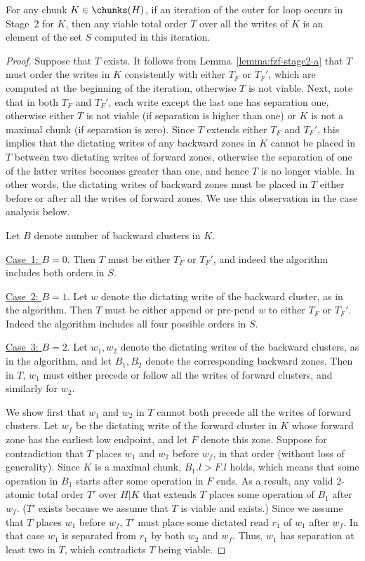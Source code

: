 \begin{lemma}
\label{lemma:fzf-stage2-b}
For any chunk $K \in \chunks(H)$, if an iteration of the outer for loop occurs in Stage~2 for $K$, then
any viable total order $T$ over all the writes of $K$ is an element
of the set $S$ computed in this iteration.
\begin{proof}
Suppose that $T$ exists.
It follows from Lemma~\ref{lemma:fzf-stage2-a} that $T$ must order the writes in $K$
consistently with either $T_F$ or $T_F'$, which are computed at the beginning of the iteration,
otherwise $T$ is not viable.
Next, note that in both $T_F$ and $T_F'$, each write except the last one has separation one,
otherwise either $T$ is not viable (if separation is higher than one) or $K$ is not a
maximal chunk (if separation is zero).
Since $T$ extends either $T_F$ and $T_F'$, this implies that
the dictating writes of any backward zones in $K$ cannot be placed in $T$ between
two dictating writes of forward zones, otherwise the separation of one of the latter writes
becomes greater than one, and hence $T$ is no longer viable.
In other words, the dictating writes of backward zones must be placed in $T$ either before
or after all the writes of forward zones.
We use this observation in the case analysis below.

Let $B$ denote number of backward clusters in $K$.

\noindent\underline{Case~1: $B = 0$}.
Then $T$ must be either $T_F$ or $T_F'$, and indeed the algorithm includes both
orders in $S$.

\noindent\underline{Case~2: $B = 1$}.
Let $w$ denote the dictating write of the backward cluster, as in the algorithm.
Then $T$ must be either append or pre-pend $w$ to either $T_F$ or $T_F'$.
Indeed the algorithm includes all four possible orders in $S$.

\noindent\underline{Case~3: $B = 2$}.
Let $w_1,w_2$ denote the dictating writes of the backward clusters, as in the algorithm,
and let $B_1,B_2$ denote the corresponding backward zones.
Then in $T$, $w_1$ must either precede or follow all the writes of forward clusters,
and similarly for $w_2$.

We show first that $w_1$ and $w_2$ in $T$ cannot both precede all the writes of forward clusters.
Let $w_f$ be the dictating write of the forward cluster in $K$ whose forward zone has the earliest low endpoint,
and let $F$ denote this zone.
Suppose for contradiction that $T$ places $w_1$ and $w_2$ before $w_f$, in that order (without loss of generality).
Since $K$ is a maximal chunk, $B_1.l > F.l$ holds, which means that some operation in $B_1$
starts after some operation in $F$ ends.
As a result, any valid 2-atomic total order $T'$ over $H|K$ that extends $T$ places some operation of $B_1$ after $w_f$.
($T'$ exists because we assume that $T$ is viable and exists.)
Since we assume that $T$ places $w_1$ before $w_f$, $T'$ must place some dictated read $r_1$ of $w_1$ after $w_f$.
In that case $w_1$ is separated from $r_1$ by both $w_2$ and $w_f$.
Thus, $w_1$ has separation at least two in $T$,
which contradicts $T$ being viable.


\end{proof}
\end{lemma}
